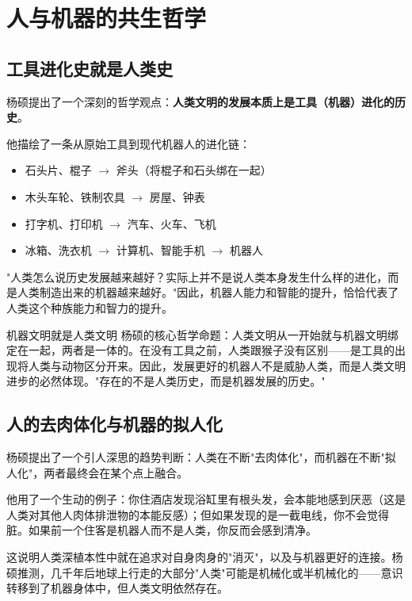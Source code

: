 \section{人与机器的共生哲学}

\subsection{工具进化史就是人类史}

杨硕提出了一个深刻的哲学观点：\textbf{人类文明的发展本质上是工具（机器）进化的历史}。

他描绘了一条从原始工具到现代机器人的进化链：
\begin{itemize}
    \item 石头片、棍子 $\to$ 斧头（将棍子和石头绑在一起）
    \item 木头车轮、铁制农具 $\to$ 房屋、钟表
    \item 打字机、打印机 $\to$ 汽车、火车、飞机
    \item 冰箱、洗衣机 $\to$ 计算机、智能手机 $\to$ 机器人
\end{itemize}

"人类怎么说历史发展越来越好？实际上并不是说人类本身发生什么样的进化，而是人类制造出来的机器越来越好。"因此，机器人能力和智能的提升，恰恰代表了人类这个种族能力和智力的提升。

\begin{importantbox}{机器文明就是人类文明}
杨硕的核心哲学命题：人类文明从一开始就与机器文明绑定在一起，两者是一体的。在没有工具之前，人类跟猴子没有区别——是工具的出现将人类与动物区分开来。因此，发展更好的机器人不是威胁人类，而是人类文明进步的必然体现。"存在的不是人类历史，而是机器发展的历史。"
\end{importantbox}

\subsection{人的去肉体化与机器的拟人化}

杨硕提出了一个引人深思的趋势判断：人类在不断"去肉体化"，而机器在不断"拟人化"，两者最终会在某个点上融合。

他用了一个生动的例子：你住酒店发现浴缸里有根头发，会本能地感到厌恶（这是人类对其他人肉体排泄物的本能反感）；但如果发现的是一截电线，你不会觉得脏。如果前一个住客是机器人而不是人类，你反而会感到清净。

这说明人类深植本性中就在追求对自身肉身的"消灭"，以及与机器更好的连接。杨硕推测，几千年后地球上行走的大部分"人类"可能是机械化或半机械化的——意识转移到了机器身体中，但人类文明依然存在。

